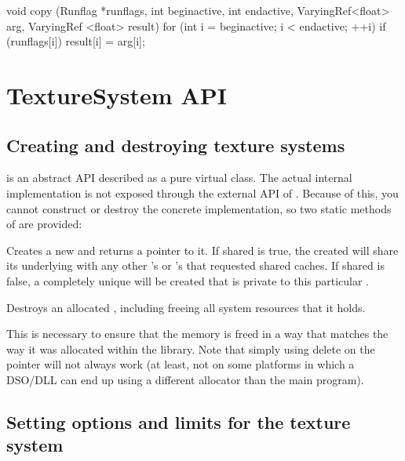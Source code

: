 \begin{code}
        void copy (Runflag *runflags, int beginactive, int endactive,
                   VaryingRef<float> arg, VaryingRef <float> result)
        {
            for (int i = beginactive; i < endactive;  ++i)
                if (runflags[i])
                    result[i] = arg[i];
        }
\end{code}


\newpage
\section{TextureSystem API}
\label{sec:texturesys:api}

\subsection{Creating and destroying texture systems}
\label{sec:texturesys:api:createdestroy}

\TextureSystem is an abstract API described as a pure
virtual class.  The actual internal implementation is not exposed
through the external API of \product.  Because of this, you cannot
construct or destroy the concrete implementation, so two static
methods of \TextureSystem are provided:

Creates a new \TextureSystem and returns a pointer to it.
If {\cf shared} is {\cf true}, the \TextureSystem created will share its
underlying \ImageCache with any other \TextureSystem's or \ImageCache's
that requested shared caches.  If {\cf shared} is {\cf false}, a
completely unique \ImageCache will be created that is private to this
particular \TextureSystem.
\apiend

Destroys an allocated \TextureSystem, including freeing all system
resources that it holds.

This is necessary to ensure that the memory is freed in a way that
matches the way it was allocated within the library.  Note that simply
using {\cf delete} on the pointer will not always work (at least,
not on some platforms in which a DSO/DLL can end up using a different
allocator than the main program).
\apiend

\subsection{Setting options and limits for the texture system}
\label{sec:texturesys:api:options}

